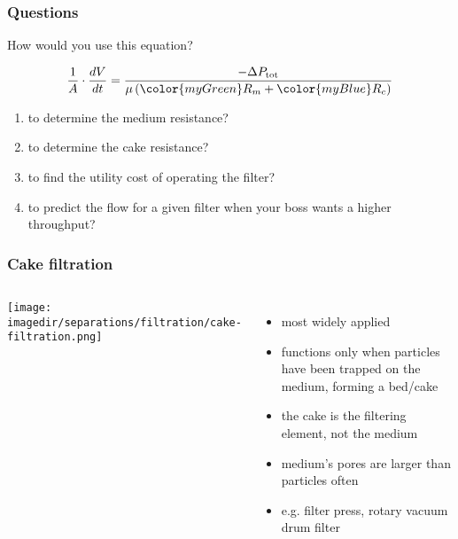 \begin{frame}\frametitle{Questions}
	How would you use this equation?
	\begin{exampleblock}{}
		\[\dfrac{1}{A} \cdot \dfrac{dV}{dt} = \dfrac{-\Delta P_\text{tot}}{\mu \left({\color{myGreen}R_m} + {\color{myBlue}R_c} \right)}\]
	\end{exampleblock}

	\begin{enumerate}
		\item	to determine the medium resistance?
		\item	to determine the cake resistance?
		\item	to find the utility cost of operating the filter?
		\item	to predict the flow for a given filter when your boss wants a higher throughput?
	\end{enumerate}
\end{frame}

\begin{frame}\frametitle{Cake filtration}
	\begin{columns}[t]
			\begin{center}
				\texttt{[image: \\imagedir/separations/filtration/cake-filtration.png]}
			\end{center}

			\begin{itemize}
				\item	most widely applied
				\item	functions only when particles have been trapped on the medium, forming a bed/cake
				\item	the cake is the filtering element, not the medium
				\item	medium's pores are larger than particles often
				\item	e.g. filter press, rotary vacuum drum filter
			\end{itemize}
	\end{columns}

\end{frame}


